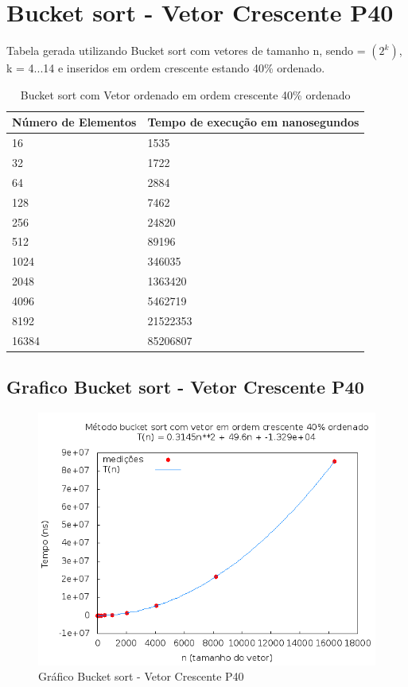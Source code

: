 \documentclass[12pt,a4paper,twoside]{report}
\begin{document}
\section{Bucket sort - Vetor Crescente P40}
Tabela gerada utilizando Bucket sort com vetores de tamanho n, sendo = $(2^k)$, k = 4...14 e inseridos em ordem crescente estando 40\% ordenado.

\begin{table}[H]
\centering
\caption{Bucket sort com Vetor ordenado em ordem crescente 40\% ordenado}
\label{my-label}
\begin{tabular}{|l|l|}
\hline
\multicolumn{1}{|c|}{\textbf{Número de Elementos}} & \multicolumn{1}{c|}{\textbf{Tempo de execução em nanosegundos}} \\ \hline
16 & 1535 \\ \hline
32 & 1722 \\ \hline
64 & 2884 \\ \hline
128 & 7462 \\ \hline
256 & 24820 \\ \hline
512 & 89196 \\ \hline
1024 & 346035 \\ \hline
2048 & 1363420 \\ \hline
4096 & 5462719 \\ \hline
8192 & 21522353 \\ \hline
16384 & 85206807 \\ \hline
\end{tabular}
\end{table}

\subsection{Grafico Bucket sort - Vetor Crescente P40}
\begin{figure}[H]
    \centering
    \includegraphics[width=0.7\linewidth]{graficos/Bucket/vIntCrescenteP40/vIntCrescenteP40.png}
  \caption{Gráfico Bucket sort - Vetor Crescente P40}
\end{figure}
\end{document}

